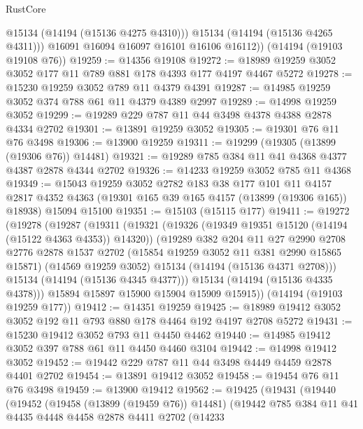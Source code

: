 \begin{lexlean}{RustCore}
\begin{coremodule}
            @15134
            (@14194 (@15136 @4275 @4310)))
          @15134
          (@14194 (@15136 @4265 @4311)))
        @16091
        @16094
        @16097
        @16101
        @16106
        @16112))
    (@14194 (@19103 @19108 @76))
@19259 := @14356 @19108
@19272 := @18989 @19259 @3052 @3052 @177 @11 @789 @881 @178 @4393 @177 @4197 @4467 @5272
@19278 := @15230 @19259 @3052 @789 @11 @4379 @4391
@19287 := @14985 @19259 @3052 @374 @788 @61 @11 @4379 @4389 @2997
@19289 := @14998 @19259 @3052
@19299 := @19289 @229 @787 @11 @44 @3498 @4378 @4388 @2878 @4334 @2702
@19301 := @13891 @19259 @3052
@19305 := @19301 @76 @11 @76 @3498
@19306 := @13900 @19259
@19311 := @19299 (@19305 (@13899 (@19306 @76)) @14481)
@19321 := @19289 @785 @384 @11 @41 @4368 @4377 @4387 @2878 @4344 @2702
@19326 := @14233 @19259 @3052 @785 @11 @4368
@19349 := @15043
    @19259
    @3052
    @2782
    @183
    @38
    @177
    @101
    @11
    @4157
    @2817
    @4352
    @4363
    (@19301 @165 @39 @165 @4157 (@13899 (@19306 @165)) @18938)
    @15094
    @15100
@19351 := @15103 (@15115 @177)
@19411 := @19272
    (@19278
      (@19287
        (@19311
          (@19321
            (@19326 (@19349 @19351 @15120 (@14194 (@15122 @4363 @4353)) @14320))
            (@19289
              @382
              @204
              @11
              @27
              @2990
              @2708
              @2776
              @2878
              @1537
              @2702
              (@15854 @19259 @3052 @11 @381 @2990 @15865 @15871)
              (@14569 @19259 @3052)
              @15134
              (@14194 (@15136 @4371 @2708)))
            @15134
            (@14194 (@15136 @4345 @4377)))
          @15134
          (@14194 (@15136 @4335 @4378)))
        @15894
        @15897
        @15900
        @15904
        @15909
        @15915))
    (@14194 (@19103 @19259 @177))
@19412 := @14351 @19259
@19425 := @18989 @19412 @3052 @3052 @192 @11 @793 @880 @178 @4464 @192 @4197 @2708 @5272
@19431 := @15230 @19412 @3052 @793 @11 @4450 @4462
@19440 := @14985 @19412 @3052 @397 @788 @61 @11 @4450 @4460 @3104
@19442 := @14998 @19412 @3052
@19452 := @19442 @229 @787 @11 @44 @3498 @4449 @4459 @2878 @4401 @2702
@19454 := @13891 @19412 @3052
@19458 := @19454 @76 @11 @76 @3498
@19459 := @13900 @19412
@19562 := @19425
    (@19431
      (@19440
        (@19452
          (@19458 (@13899 (@19459 @76)) @14481)
          (@19442
            @785
            @384
            @11
            @41
            @4435
            @4448
            @4458
            @2878
            @4411
            @2702
            (@14233

\end{coremodule}
\end{lexlean}
